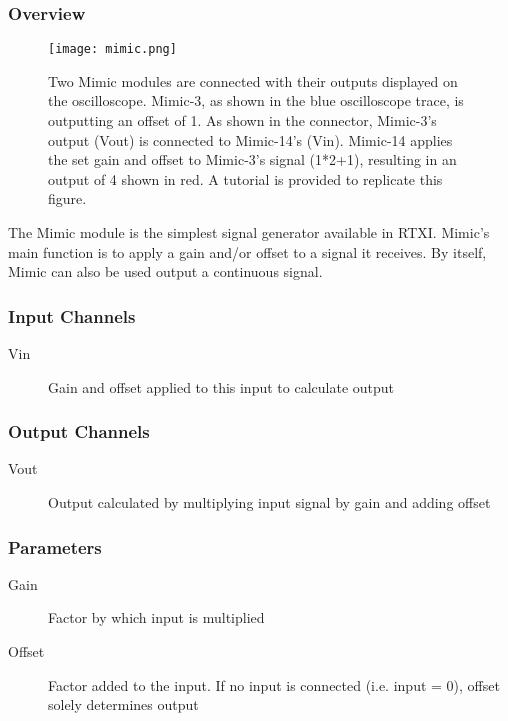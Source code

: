 
\subsubsection{Overview}
\label{Mimic}

\begin{figure}[h]
\begin{center}
\texttt{[image: mimic.png]} 
\caption[Mimic]{Two Mimic modules are connected with their outputs displayed on the oscilloscope. Mimic-3, as shown in the blue oscilloscope trace, is outputting an offset of 1. As shown in the connector, Mimic-3's output (Vout) is connected to Mimic-14's (Vin). Mimic-14 applies the set gain and offset to Mimic-3's signal (1*2+1), resulting in an output of 4 shown in red. A tutorial is provided to replicate this figure.}
\end{center}
\label{mimic1}
\end{figure}

The Mimic module is the simplest signal generator available in RTXI. Mimic's main function is to apply a gain and/or offset to a signal it receives. By itself, Mimic can also be used output a continuous signal.

\subsubsection{Input Channels}
\begin{description}
\item [Vin]Gain and offset applied to this input to calculate output
\end{description}

\subsubsection{Output Channels}
\begin{description}
\item [Vout]Output calculated by multiplying input signal by gain and adding offset
\end{description}

\subsubsection{Parameters}
\begin{description}
\item [Gain]Factor by which input is multiplied
\item [Offset]Factor added to the input. If no input is connected (i.e. input = 0), offset solely determines output
\end{description}

